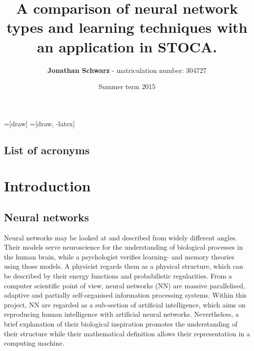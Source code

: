 \documentclass[10pt,a4paper,DIV=11]{scrreprt}
\title
{
     A comparison of neural network types and learning techniques with an application in STOCA\cite{DANIEL}.
}
\author
{
    \textbf{Jonathan Schwarz} - matriculation number: 304727
}
\date
{
    Summer term 2015
}
\begin{document}
=[draw]
=[draw, -latex] 


\maketitle
\thispagestyle{empty}
\newpage
{\large\tableofcontents}
\newpage

\thispagestyle{empty}

\section*{List of acronyms}
\begin{acronym}
\end{acronym}

\newpage

\chapter{Introduction}
\section{Neural networks}
Neural networks may be looked at and described from widely different angles. Their models serve neuroscience for the understanding of biological processes in the human brain, while a psychologist verifies learning- and memory theories using those models. A physicist regards them as a physical structure, which can be described by their energy functions and probabilistic regularities. From a computer scientific point of view, neural networks (NN) are massive parallelised, adaptive and partially self-organised information processing systems. \cite{NNGER}
Within this project, NN are regarded as a sub-section of artificial intelligence, which aims on reproducing human intelligence with artificial neural networks. Nevertheless, a brief explanation of their biological inspiration promotes the understanding of their structure while their mathematical definition allows their representation in a computing machine.
\end{document}
